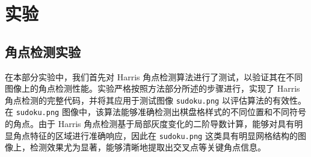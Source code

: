 \documentclass[a4paper, utf8]{ctexart}
\begin{document}
	\section{实验}
	
	\subsection{角点检测实验}
	
	在本部分实验中，我们首先对 Harris 角点检测算法进行了测试，以验证其在不同图像上的角点检测性能。实验严格按照方法部分所述的步骤进行，实现了 Harris 角点检测的完整代码，并将其应用于测试图像 \verb|sudoku.png| 以评估算法的有效性。在 \verb|sudoku.png| 图像中，该算法能够准确检测出棋盘格样式的不同位置和不同符号的角点。由于 Harris 角点检测基于局部灰度变化的二阶导数计算，能够对具有明显角点特征的区域进行准确响应，因此在 \verb|sudoku.png| 这类具有明显网格结构的图像上，检测效果尤为显著，能够清晰地提取出交叉点等关键角点信息。
	
\end{document}
